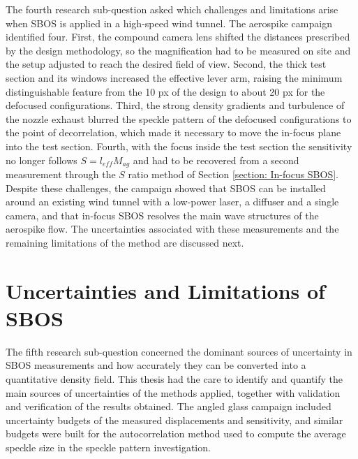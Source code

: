 The fourth research sub-question asked which challenges and limitations arise when SBOS is applied in a high-speed wind tunnel. The aerospike campaign identified four. First, the compound camera lens shifted the distances prescribed by the design methodology, so the magnification had to be measured on site and the setup adjusted to reach the desired field of view. Second, the thick test section and its windows increased the effective lever arm, raising the minimum distinguishable feature from the 10 px of the design to about 20 px for the defocused configurations. Third, the strong density gradients and turbulence of the nozzle exhaust blurred the speckle pattern of the defocused configurations to the point of decorrelation, which made it necessary to move the in-focus plane into the test section. Fourth, with the focus inside the test section the sensitivity no longer follows $S = l_{eff} M_{ag}$ and had to be recovered from a second measurement through the $S$ ratio method of Section \ref{section: In-focus SBOS}. Despite these challenges, the campaign showed that SBOS can be installed around an existing wind tunnel with a low-power laser, a diffuser and a single camera, and that in-focus SBOS resolves the main wave structures of the aerospike flow. The uncertainties associated with these measurements and the remaining limitations of the method are discussed next.

\section{Uncertainties and Limitations of SBOS}
\label{section: Uncertainties and Limitations}

The fifth research sub-question concerned the dominant sources of uncertainty in SBOS measurements and how accurately they can be converted into a quantitative density field. This thesis had the care to identify and quantify the main sources of uncertainties of the methods applied, together with validation and verification of the results obtained. The angled glass campaign included uncertainty budgets of the measured displacements and sensitivity, and similar budgets were built for the autocorrelation method used to compute the average speckle size in the speckle pattern investigation.

